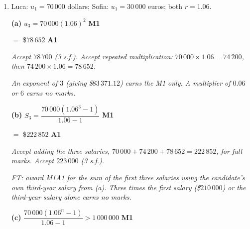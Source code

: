 \documentclass[12pt, twoside]{article}
\begin{document}
\begin{enumerate}[itemsep=0.3cm]
\textbf{(d)} $\dfrac{2\left(3^{n} - 1\right)}{3 - 1} = 177\,146$ \hfill \textbf{M1}

$3^{n} - 1 = 177\,146 \ \Rightarrow \ 3^{n} = 177\,147$

$n = 11$ \hfill \textbf{A1}

\emph{Accept solving the equation on the GDC, with logarithms, or by a
table of sums ($S_{10} = 59\,048$, $S_{11} = 177\,146$). Accept trial of
powers of $3$ ($3^{11} = 177\,147$).}

\emph{M1 is for an equation setting a sum expression in $n$ equal to
$177\,146$, or for a table of sums reaching $177\,146$. Setting a term
expression equal to $177\,146$ ($2 \times 3^{\,n-1} = 177\,146$) earns no
marks.}

\newpage

\item[2.] [Maximum mark: 8]

Luca: $u_{1} = 70\,000$ dollars; Sofia: $u_{1} = 30\,000$ euros; both
$r = 1.06$.

\medskip

\textbf{(a)} $u_{3} = 70\,000(1.06)^{2}$ \hfill \textbf{M1}

$=$ \$$78\,652$ \hfill \textbf{A1}

\emph{Accept $78\,700$ (3 s.f.). Accept repeated multiplication:
$70\,000 \times 1.06 = 74\,200$, then $74\,200 \times 1.06 = 78\,652$.}

\emph{An exponent of $3$ (giving \$$83\,371.12$) earns the M1 only. A
multiplier of $0.06$ or $6$ earns no marks.}

\medskip

\textbf{(b)} $S_{3} = \dfrac{70\,000\left(1.06^{3} - 1\right)}{1.06 - 1}$ \hfill \textbf{M1}

$=$ \$$222\,852$ \hfill \textbf{A1}

\emph{Accept adding the three salaries,
$70\,000 + 74\,200 + 78\,652 = 222\,852$, for full marks. Accept $223\,000$
(3 s.f.).}

\emph{FT: award M1A1 for the sum of the first three salaries using the
candidate's own third-year salary from (a). Three times the first salary
(\$$210\,000$) or the third-year salary alone earns no marks.}

\medskip

\textbf{(c)} $\dfrac{70\,000\left(1.06^{n} - 1\right)}{1.06 - 1} > 1\,000\,000$ \hfill \textbf{M1}


\end{enumerate}
\end{document}

